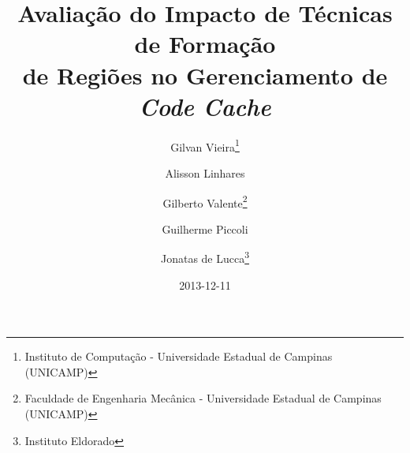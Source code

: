 \documentclass[12pt,twoside]{article}
\begin{document}
% 

%



\TRMakeCover

%
\pagestyle{myheadings}

%
\title{Avaliação do Impacto de Técnicas de Formação\\ de Regiões no Gerenciamento de \emph{Code Cache}}

\author{Gilvan Vieira\thanks{Instituto de Computação - Universidade Estadual de Campinas (UNICAMP)} \and
Alisson Linhares\footnotemark[1] \and Gilberto Valente\thanks{Faculdade de Engenharia Mecânica - Universidade Estadual de Campinas (UNICAMP)} \and Guilherme Piccoli\footnotemark[1] \and Jonatas de Lucca\thanks{Instituto Eldorado}}

\date{2013-12-11}

\maketitle



%
%  
\end{document}
